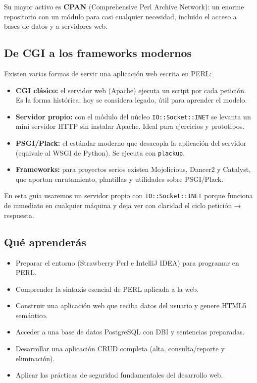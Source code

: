\documentclass[11pt]{article}
\begin{document}
Su mayor activo es \textbf{CPAN} (Comprehensive Perl Archive Network): un enorme repositorio con un módulo para casi cualquier necesidad, incluido el acceso a bases de datos y a servidores web.

\subsection{De CGI a los frameworks modernos}
Existen varias formas de servir una aplicación web escrita en PERL:

\begin{itemize}[leftmargin=1.4em,itemsep=2pt,topsep=2pt]
\item \textbf{CGI clásico:} el servidor web (Apache) ejecuta un script por cada petición. Es la forma histórica; hoy se considera legado, útil para aprender el modelo.
\item \textbf{Servidor propio:} con el módulo del núcleo \texttt{IO::Socket::INET} se levanta un mini servidor HTTP sin instalar Apache. Ideal para ejercicios y prototipos.
\item \textbf{PSGI/Plack:} el estándar moderno que desacopla la aplicación del servidor (equivale al WSGI de Python). Se ejecuta con \texttt{plackup}.
\item \textbf{Frameworks:} para proyectos serios existen Mojolicious, Dancer2 y Catalyst, que aportan enrutamiento, plantillas y utilidades sobre PSGI/Plack.
\end{itemize}
En esta guía usaremos un servidor propio con \texttt{IO::Socket::INET} porque funciona de inmediato en cualquier máquina y deja ver con claridad el ciclo petición → respuesta.

\subsection{Qué aprenderás}
\begin{itemize}[leftmargin=1.4em,itemsep=2pt,topsep=2pt]
\item Preparar el entorno (Strawberry Perl e IntelliJ IDEA) para programar en PERL.
\item Comprender la sintaxis esencial de PERL aplicada a la web.
\item Construir una aplicación web que reciba datos del usuario y genere HTML5 semántico.
\item Acceder a una base de datos PostgreSQL con DBI y sentencias preparadas.
\item Desarrollar una aplicación CRUD completa (alta, consulta/reporte y eliminación).
\item Aplicar las prácticas de seguridad fundamentales del desarrollo web.
\end{itemize}
\end{document}
